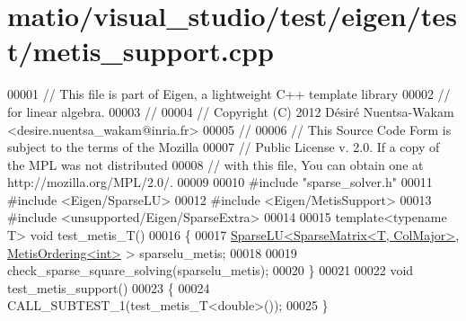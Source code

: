 \hypertarget{matio_2visual__studio_2test_2eigen_2test_2metis__support_8cpp_source}{}\section{matio/visual\+\_\+studio/test/eigen/test/metis\+\_\+support.cpp}
\label{matio_2visual__studio_2test_2eigen_2test_2metis__support_8cpp_source}

\begin{DoxyCode}
00001 \textcolor{comment}{// This file is part of Eigen, a lightweight C++ template library}
00002 \textcolor{comment}{// for linear algebra.}
00003 \textcolor{comment}{//}
00004 \textcolor{comment}{// Copyright (C) 2012 Désiré Nuentsa-Wakam <desire.nuentsa\_wakam@inria.fr>}
00005 \textcolor{comment}{//}
00006 \textcolor{comment}{// This Source Code Form is subject to the terms of the Mozilla}
00007 \textcolor{comment}{// Public License v. 2.0. If a copy of the MPL was not distributed}
00008 \textcolor{comment}{// with this file, You can obtain one at http://mozilla.org/MPL/2.0/.}
00009 
00010 \textcolor{preprocessor}{#include "sparse\_solver.h"}
00011 \textcolor{preprocessor}{#include <Eigen/SparseLU>}
00012 \textcolor{preprocessor}{#include <Eigen/MetisSupport>}
00013 \textcolor{preprocessor}{#include <unsupported/Eigen/SparseExtra>}
00014 
00015 \textcolor{keyword}{template}<\textcolor{keyword}{typename} T> \textcolor{keywordtype}{void} test\_metis\_T()
00016 \{
00017   \hyperlink{group___sparse_l_u___module_class_eigen_1_1_sparse_l_u}{SparseLU<SparseMatrix<T, ColMajor>}, 
      \hyperlink{class_eigen_1_1_metis_ordering}{MetisOrdering<int>} > sparselu\_metis;
00018   
00019   check\_sparse\_square\_solving(sparselu\_metis); 
00020 \}
00021 
00022 \textcolor{keywordtype}{void} test\_metis\_support()
00023 \{
00024   CALL\_SUBTEST\_1(test\_metis\_T<double>());
00025 \}
\end{DoxyCode}
